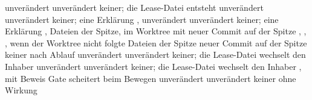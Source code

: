 \startplacetable[title={Was die Schritte der Sitzung ändern},
  reference=tab:phase4-workflow-effects,location=split]
\startxtable[frame=off,split=yes,option=stretch]
\startxtablehead
\startxrow[topframe=on,bottomframe=on]
 \stopxcell
{} \stopxcell
{} \stopxcell
{} \stopxcell
{} \stopxcell
\stopxrow
\stopxtablehead
\startxtablenext
\startxrow[topframe=on,bottomframe=on]
 \stopxcell
{} \stopxcell
{} \stopxcell
{} \stopxcell
{} \stopxcell
\stopxrow
\stopxtablenext
\startxrow
\startxcell {} \stopxcell
\startxcell unverändert \stopxcell
\startxcell unverändert \stopxcell
\startxcell keiner; die Lease-Datei entsteht \stopxcell
\startxcell {} \stopxcell
\stopxrow
\startxrow
\startxcell {} \stopxcell
\startxcell unverändert \stopxcell
\startxcell unverändert \stopxcell
\startxcell keiner; eine Erklärung \stopxcell
\startxcell {} \stopxcell
\stopxrow
\startxrow
\startxcell {},  \stopxcell
\startxcell unverändert \stopxcell
\startxcell unverändert \stopxcell
\startxcell keiner; eine Erklärung \stopxcell
\startxcell {},  \stopxcell
\stopxrow
\startxrow
\startxcell {} \stopxcell
\startxcell Dateien der Spitze, im Worktree mit  \stopxcell
\startxcell neuer Commit auf der Spitze \stopxcell
\startxcell {} \stopxcell
\startxcell {}, ,  \stopxcell
\stopxrow
\startxrow
\startxcell {}, wenn der Worktree nicht folgte \stopxcell
\startxcell Dateien der Spitze \stopxcell
\startxcell neuer Commit auf der Spitze \stopxcell
\startxcell keiner \stopxcell
\startxcell {} \stopxcell
\stopxrow
\startxrow
\startxcell {} nach Ablauf \stopxcell
\startxcell unverändert \stopxcell
\startxcell unverändert \stopxcell
\startxcell keiner; die Lease-Datei wechselt den Inhaber \stopxcell
\startxcell {} \stopxcell
\stopxrow
\startxrow
\startxcell {} \stopxcell
\startxcell unverändert \stopxcell
\startxcell unverändert \stopxcell
\startxcell keiner; die Lease-Datei wechselt den Inhaber \stopxcell
\startxcell {}, mit Beweis \stopxcell
\stopxrow
\startxrow[bottomframe=on]
\startxcell Gate scheitert beim Bewegen \stopxcell
\startxcell unverändert \stopxcell
\startxcell unverändert \stopxcell
\startxcell keiner \stopxcell
\startxcell {} ohne Wirkung \stopxcell
\stopxrow
\stopxtable
\stopplacetable

